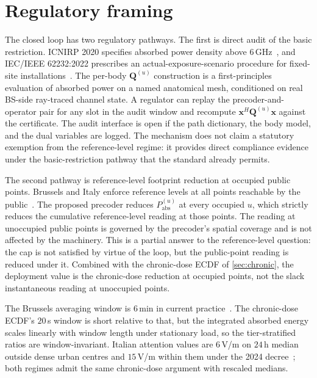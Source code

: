 \documentclass[journal,twocolumn,10pt]{IEEEtran}
\theoremstyle{plain}
\theoremstyle{remark}
\newcommand{\xx}{\mathbf{x}}
\newcommand{\Pabs}{P_{\mathrm{abs}}}
\newcommand{\Qmat}{\mathbf{Q}}
\begin{document}
\section{Regulatory framing}\label{sec:regulatory}

The closed loop has two regulatory pathways. The first is direct
audit of the basic restriction. ICNIRP 2020 specifies absorbed power
density above 6\,GHz~\cite{ICNIRP2020}, and IEC/IEEE 62232:2022
prescribes an actual-exposure-scenario procedure for fixed-site
installations~\cite{IEC62232}. The per-body $\Qmat^{(u)}$
construction is a first-principles evaluation of absorbed power on a
named anatomical mesh, conditioned on real BS-side ray-traced channel
state. A regulator can replay the precoder-and-operator pair for any
slot in the audit window and recompute $\xx^H \Qmat^{(u)} \xx$
against the certificate. The audit interface is open if the path
dictionary, the body model, and the dual variables are logged. The
mechanism does not claim a statutory exemption from the
reference-level regime: it provides direct compliance evidence
under the basic-restriction pathway that the standard already
permits.

The second pathway is reference-level footprint reduction at occupied
public points. Brussels and Italy enforce reference levels at all
points reachable by the public~\cite{BrusselsArrete2007,ItalyDL}. The
proposed precoder reduces $\Pabs^{(u)}$ at every occupied $u$,
which strictly reduces the cumulative reference-level reading at
those points. The reading at unoccupied public points is governed by
the precoder's spatial coverage and is not affected by the
machinery. This is a partial answer to the reference-level question:
the cap is not satisfied by virtue of the loop, but the
public-point reading is reduced under it. Combined with the
chronic-dose ECDF of \cref{sec:chronic}, the deployment value is the
chronic-dose reduction at occupied points, not the slack
instantaneous reading at unoccupied points.

The Brussels averaging window is $6\,$min in current
practice~\cite{BrusselsArrete2024}. The chronic-dose ECDF's
$20\,$s window is short relative to that, but the integrated absorbed
energy scales linearly with window length under stationary load, so
the tier-stratified ratios are window-invariant. Italian attention
values are $6\,$V/m on $24\,$h median outside dense urban centres
and $15\,$V/m within them under the 2024 decree~\cite{ItalyDL};
both regimes admit the same chronic-dose argument with rescaled
medians.
\end{document}
